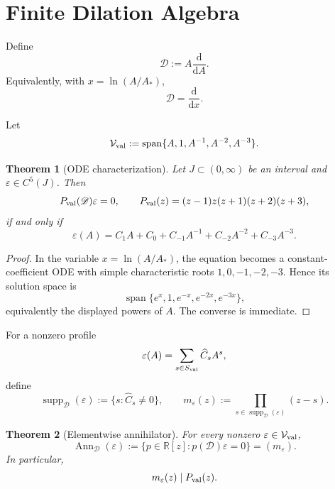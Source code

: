 \documentclass[aps,prd,preprint,onecolumn,nofootinbib,superscriptaddress,showkeys]{revtex4-2}
\numberwithin{equation}{section}
\theoremstyle{definition}
\theoremstyle{plain}
\newtheorem{theorem}{Theorem}[section]
\newcommand{\R}{\mathbb R}
\newcommand{\dd}{\mathrm d}
\newcommand{\Dil}{\mathscr D}
\newcommand{\Ann}{\operatorname{Ann}}
\newcommand{\spanop}{\operatorname{span}}
\begin{document}
\section{Finite Dilation Algebra}

Define
\begin{equation}
\Dil:=A\frac{\dd}{\dd A}.
\end{equation}
Equivalently, with \(x=\ln(A/A_*)\),
\begin{equation}
\Dil=\frac{\dd}{\dd x}.
\end{equation}

Let
\begin{equation}
\mathcal V_{\rm val}
:=
\spanop\{A,1,A^{-1},A^{-2},A^{-3}\}.
\end{equation}

\begin{theorem}[ODE characterization]
Let \(J\subset(0,\infty)\) be an interval and \(\varepsilon\in C^5(J)\).  Then
\begin{equation}
P_{\rm val}(\Dil)\varepsilon=0,
\qquad
P_{\rm val}(z)=(z-1)z(z+1)(z+2)(z+3),
\end{equation}
if and only if
\begin{equation}
\varepsilon(A)
=
C_1A+C_0+C_{-1}A^{-1}+C_{-2}A^{-2}+C_{-3}A^{-3}.
\end{equation}
\end{theorem}

\begin{proof}
In the variable \(x=\ln(A/A_*)\), the equation becomes a constant-coefficient ODE with simple characteristic roots \(1,0,-1,-2,-3\).  Hence its solution space is
\[
\spanop\{e^x,1,e^{-x},e^{-2x},e^{-3x}\},
\]
equivalently the displayed powers of \(A\).  The converse is immediate.
\end{proof}

For a nonzero profile
\begin{equation}
\varepsilon(A)=\sum_{s\in S_{\rm val}}\widehat C_sA^s,
\end{equation}
define
\begin{equation}
\operatorname{supp}_{\Dil}(\varepsilon)
:=
\{s:\widehat C_s\ne0\},
\qquad
m_\varepsilon(z)
:=
\prod_{s\in\operatorname{supp}_{\Dil}(\varepsilon)}(z-s).
\end{equation}

\begin{theorem}[Elementwise annihilator]
For every nonzero \(\varepsilon\in\mathcal V_{\rm val}\),
\begin{equation}
\Ann_{\Dil}(\varepsilon)
:=
\{p\in\R[z]:p(\Dil)\varepsilon=0\}
=
(m_\varepsilon).
\end{equation}
In particular,
\begin{equation}
m_\varepsilon(z)\mid P_{\rm val}(z).
\end{equation}
\end{theorem}
\end{document}
